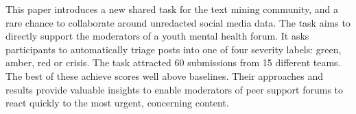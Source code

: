 This paper introduces a new shared task for the text mining community, and a rare chance to collaborate around unredacted social media data. The task aims to directly support the moderators of a youth mental health forum. It asks participants to automatically triage posts into one of four severity labels: green, amber, red or crisis. The task attracted 60 submissions from 15 different teams. The best of these achieve scores well above baselines. Their approaches and results provide valuable insights to enable moderators of peer support forums to react quickly to the most urgent, concerning content.
